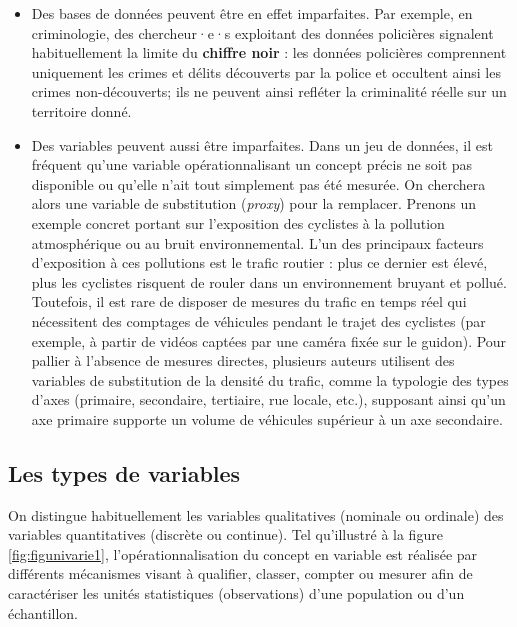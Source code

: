 \documentclass[
  11pt,
  french,
]{book}
\makeatletter
\newenvironment{kframev}{%
\medskip{}
\setlength{\fboxsep}{.8em}
 \def\at@end@of@kframev{}%
 \ifinner\ifhmode%
  \def\at@end@of@kframev{\end{minipage}}%
  \begin{minipage}{\columnwidth}%
 \fi\fi%
 \def\FrameCommand##1{\hskip\@totalleftmargin \hskip-\fboxsep
 \colorbox{shadebluecolor}{##1}\hskip-\fboxsep
     \hskip-\linewidth \hskip-\@totalleftmargin \hskip\columnwidth}%
 \MakeFramed {\advance\hsize-\width
   \@totalleftmargin\z@ \linewidth\hsize
   \@setminipage}}%
 {\par\unskip\endMakeFramed%
 \at@end@of@kframev}
\newenvironment{rmdblock}[1]
  {
  \begin{itemize}
  \renewcommand{\labelitemi}{
    \raisebox{-.7\height}[0pt][0pt]{
      {\setkeys{Gin}{width=3em,keepaspectratio}\texttt{[image: images/\#1]}}
    }
  }
  \setlength{\fboxsep}{1em}
  \begin{kframev}
  \small
  \item
  }
  {
  \end{kframev}
  \end{itemize}
  }
\newenvironment{bloc_attention}
  {\begin{rmdblock}{attention}}
  {\end{rmdblock}}
\makeatother
\begin{document}
\begin{bloc_attention}
\begin{itemize}
\item
  Des bases de données peuvent être en effet imparfaites. Par exemple, en criminologie, des chercheur·e·s exploitant des données policières signalent habituellement la limite du \textbf{chiffre noir} : les données policières comprennent uniquement les crimes et délits découverts par la police et occultent ainsi les crimes non-découverts; ils ne peuvent ainsi refléter la criminalité réelle sur un territoire donné.
\item
  Des variables peuvent aussi être imparfaites. Dans un jeu de données, il est fréquent qu'une variable opérationnalisant un concept précis ne soit pas disponible ou qu'elle n'ait tout simplement pas été mesurée. On cherchera alors une variable de substitution (\emph{proxy}) pour la remplacer. Prenons un exemple concret portant sur l'exposition des cyclistes à la pollution atmosphérique ou au bruit environnemental. L'un des principaux facteurs d'exposition à ces pollutions est le trafic routier : plus ce dernier est élevé, plus les cyclistes risquent de rouler dans un environnement bruyant et pollué. Toutefois, il est rare de disposer de mesures du trafic en temps réel qui nécessitent des comptages de véhicules pendant le trajet des cyclistes (par exemple, à partir de vidéos captées par une caméra fixée sur le guidon). Pour pallier à l'absence de mesures directes, plusieurs auteurs utilisent des variables de substitution de la densité du trafic, comme la typologie des types d'axes (primaire, secondaire, tertiaire, rue locale, etc.), supposant ainsi qu'un axe primaire supporte un volume de véhicules supérieur à un axe secondaire.
\end{itemize}


\end{bloc_attention}

\hypertarget{sect0212}{%
\subsection{Les types de variables}\label{sect0212}}

On distingue habituellement les variables qualitatives (nominale ou ordinale) des variables quantitatives (discrète ou continue). Tel qu'illustré à la figure \ref{fig:figunivarie1}, l'opérationnalisation du concept en variable est réalisée par différents mécanismes visant à qualifier, classer, compter ou mesurer afin de caractériser les unités statistiques (observations) d'une population ou d'un échantillon.
\end{document}
